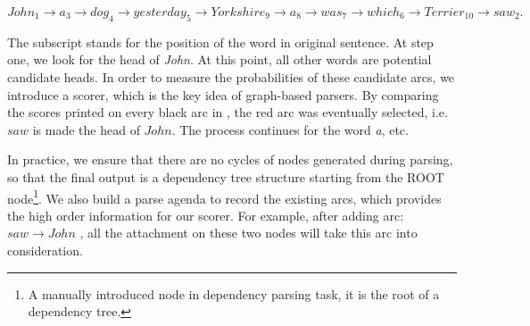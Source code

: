 \noindent
$John_{1}\rightarrow a_{3}\rightarrow dog_{4}\rightarrow yesterday_{5}\rightarrow Yorkshire_{9}\rightarrow a_{8}\rightarrow was_{7}\rightarrow which_{6}\rightarrow Terrier_{10}\rightarrow saw_{2}.$

The subscript stands for the position of the word in original sentence.
At step one, we look for the head of \textit{John}. At this point,
all other words are potential candidate heads. In order to measure
the probabilities of these candidate arcs, we introduce a scorer, which
is the key idea of graph-based parsers. By comparing the scores
printed on every black arc in ,
the red arc was eventually selected, i.e. $saw$ is made the head
of $John$. The process continues for the word \textit{a}, etc.

In practice, we
ensure that
there are no cycles of nodes generated during parsing, so that the final output
is a dependency tree structure starting from
the ROOT node\footnote{A manually introduced node in dependency parsing task,
it is the root of a dependency tree.}.
We also build a parse agenda to record the existing arcs, which
provides the high order information for our scorer.
For example, after adding arc:$saw \rightarrow John$ , all
the attachment on these two nodes will take this arc into consideration.
